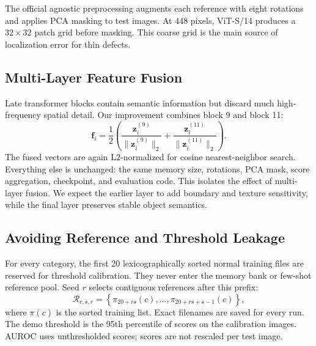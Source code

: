 The official agnostic preprocessing augments each reference with eight
rotations and applies PCA masking to test images. At $448$ pixels,
ViT-S/14 produces a $32\times32$ patch grid before masking. This coarse grid is
the main source of localization error for thin defects.

\subsection{Multi-Layer Feature Fusion}
Late transformer blocks contain semantic information but discard much
high-frequency spatial detail. Our improvement combines block 9 and block 11:
\begin{equation}
\mathbf{f}_i =
\frac{1}{2}\left(
\frac{\mathbf{z}^{(9)}_i}{\|\mathbf{z}^{(9)}_i\|_2}
+
\frac{\mathbf{z}^{(11)}_i}{\|\mathbf{z}^{(11)}_i\|_2}
\right).
\end{equation}
The fused vectors are again L2-normalized for cosine nearest-neighbor search.
Everything else is unchanged: the same memory size, rotations, PCA mask,
score aggregation, checkpoint, and evaluation code. This isolates the effect of
multi-layer fusion. We expect the earlier layer to add boundary and texture
sensitivity, while the final layer preserves stable object semantics.

\subsection{Avoiding Reference and Threshold Leakage}
For every category, the first 20 lexicographically sorted normal training files
are reserved for threshold calibration. They never enter the memory bank or
few-shot reference pool. Seed $r$ selects contiguous references after this
prefix:
\begin{equation}
\mathcal{R}_{c,s,r} =
\left\{\pi_{20+rs}(c),\ldots,\pi_{20+rs+s-1}(c)\right\},
\end{equation}
where $\pi(c)$ is the sorted training list. Exact filenames are saved for every
run. The demo threshold is the 95th percentile of scores on the calibration
images. AUROC uses unthresholded scores; scores are not rescaled per test image.
